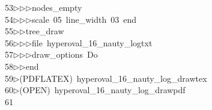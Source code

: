 \begin{tabbing}
53\>$\triangleright$\>$\triangleright$\>$\triangleright$\>nodes\_empty\ \\[0pt]
54\>$\triangleright$\>$\triangleright$\>$\triangleright$\>scale\ 05\ line\_width\ 03\ end\ \\[0pt]
55\>$\triangleright$\>$\triangleright$\>tree\_draw\ \\[0pt]
56\>$\triangleright$\>$\triangleright$\>$\triangleright$\>file\ hyperoval\_16\_nauty\_logtxt\ \\[0pt]
57\>$\triangleright$\>$\triangleright$\>$\triangleright$\>draw\_options\ Do\ \\[0pt]
58\>$\triangleright$\>$\triangleright$\>end\\[0pt]
59\>$\triangleright$\>(PDFLATEX)\ hyperoval\_16\_nauty\_log\_drawtex\\[0pt]
60\>$\triangleright$\>(OPEN)\ hyperoval\_16\_nauty\_log\_drawpdf\\[0pt]
61\>\end{tabbing}

